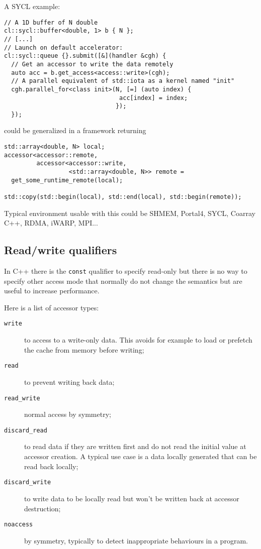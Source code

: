 \documentclass{article}
\begin{document}
A SYCL example:
\begin{lstlisting}
// A 1D buffer of N double
cl::sycl::buffer<double, 1> b { N };
// [...]
// Launch on default accelerator:
cl::sycl::queue {}.submit([&](handler &cgh) {
  // Get an accessor to write the data remotely
  auto acc = b.get_access<access::write>(cgh);
  // A parallel equivalent of std::iota as a kernel named "init"
  cgh.parallel_for<class init>(N, [=] (auto index) {
                                acc[index] = index;
                               });
  });
\end{lstlisting}

could be generalized in a framework returning
\begin{lstlisting}
std::array<double, N> local;
accessor<accessor::remote,
         accessor<accessor::write,
                  <std::array<double, N>> remote =
  get_some_runtime_remote(local);

std::copy(std::begin(local), std::end(local), std::begin(remote));
\end{lstlisting}

Typical environment usable with this could be SHMEM, Portal4, SYCL,
Coarray C++, RDMA, iWARP, MPI...


\subsection{Read/write qualifiers}
\label{sec:readwrite-qualifiers}

In C++ there is the \lstinline|const| qualifier to specify read-only
but there is no way to specify other access mode that normally do not
change the semantics but are useful to increase performance.

Here is a list of accessor types:
\begin{description}
\item[\texttt{write}] to access to a write-only data. This avoids for
  example to load or prefetch the cache from memory before writing;
\item[\texttt{read}] to prevent writing back data;
\item[\texttt{read\_write}] normal access by symmetry;
\item[\texttt{discard\_read}] to read data if they are written first
  and do not read the initial value at accessor creation. A typical
  use case is a data locally generated that can be read back locally;
\item[\texttt{discard\_write}] to write data to be locally read but
  won't be written back at accessor destruction;
\item[\texttt{noaccess}] by symmetry, typically to detect
  inappropriate behaviours in a program.
\end{description}
\end{document}
